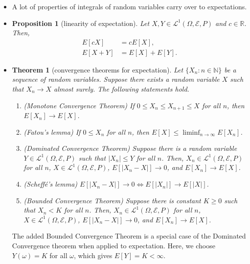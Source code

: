 \documentclass[10pt]{article}
\newtheorem{theorem}[lemma]{Theorem}
\newtheorem{proposition}[lemma]{Proposition}
\numberwithin{lemma}{section}
\newcommand{\mcal}[1]{\mathcal{#1}}
\newcommand{\Real}{\mathbb{R}}
\newcommand{\Nat}{\mathbb{N}}
\begin{document}
\begin{itemize}
  \item A lot of properties of integrals of random variables carry over to expectations.
  
  \item \begin{proposition}[linearity of expectation]
    Let $X,Y \in \mcal{L}^1(\Omega,\mcal{E},P)$ and $c \in \Real$. Then,
    \begin{align*}
      E[cX] &= cE[X], \\
      E[X+Y] &= E[X] + E[Y].
    \end{align*}
  \end{proposition}

  \item \begin{theorem}[convergence theorems for expectation]
    Let $\{ X_n : n \in \Nat \}$ be a sequence of random variables. Suppose there exists a random variable $X$ such that $X_n \rightarrow X$ almost surely. The following statements hold.
    \begin{enumerate}
      \item (Monotone Convergence Theorem) If $0 \leq X_n \leq X_{n+1} \leq X$ for all $n$, then $E[X_n] \rightarrow E[X]$.
      \item (Fatou's lemma) If $0 \leq X_n$ for all $n$, then $E[X] \leq \liminf_{n \rightarrow \infty} E[X_n]$.
      \item (Dominated Convergence Theorem) Suppose there is a random variable $Y \in \mcal{L}^1(\Omega,\mcal{E},P)$ such that $|X_n| \leq Y$ for all $n$. Then, $X_n \in \mcal{L}^1(\Omega,\mcal{E},P)$ for all $n$, $X \in \mcal{L}^1(\Omega,\mcal{E},P)$, $E[|X_n - X|] \rightarrow 0$, and $E[X_n] \rightarrow E[X]$.  
      \item (Scheff\'{e}'s lemma) $E[|X_n - X|] \rightarrow 0 \iff E[|X_n|] \rightarrow E[|X|]$.
      \item (Bounded Convergence Theorem) Suppose there is constant $K \geq 0$ such that $X_n < K$ for all $n$. Then, $X_n \in \mcal{L}^1(\Omega,\mcal{E},P)$ for all $n$, $X \in \mcal{L}^1(\Omega,\mcal{E},P)$, $E[|X_n - X|] \rightarrow 0$, and $E[X_n] \rightarrow E[X]$.
    \end{enumerate}
  \end{theorem}
  The added Bounded Convergence Theorem is a special case of the Dominated Convergence theorem when applied to expectation. Here, we choose $Y(\omega) = K$ for all $\omega$, which gives $E[Y] = K < \infty$.


\end{itemize}
\end{document}

